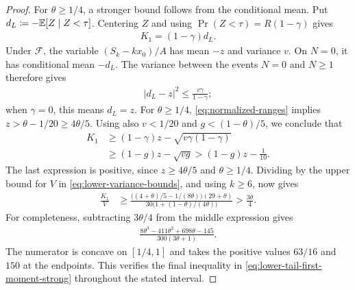 \begin{proof}
For $\theta\ge1/4$, a stronger bound follows from the conditional mean.
Put $d_L\coloneqq-\mathbb E[Z\mid Z<\tau]$.
Centering $Z$ and using $\Pr(Z<\tau)=R(1-\gamma)$ gives
\begin{align*}
 K_1=(1-\gamma)d_L.
\end{align*}
Under $\mathcal F$, the variable $(S_k-kx_0)/A$ has mean $-z$ and variance $v$.
On $N=0$, it has conditional mean $-d_L$.
The variance between the events $N=0$ and $N\ge1$ therefore gives
\begin{align*}
 |d_L-z|^2\le\frac{v\gamma}{1-\gamma};
\end{align*}
when $\gamma=0$, this means $d_L=z$.
For $\theta\ge1/4$, \cref{eq:normalized-ranges} implies
$z>\theta-1/20\ge4\theta/5$.
Using also $v<1/20$ and $g<(1-\theta)/5$, we conclude that
\begin{align*}
 K_1
 &\ge(1-\gamma)z-\sqrt{v\gamma(1-\gamma)}\\
 &\ge(1-g)z-\sqrt{vg}
 >(1-g)z-\frac1{10}.
\end{align*}
The last expression is positive, since $z\ge4\theta/5$ and $\theta\ge1/4$.
Dividing by the upper bound for $V$ in \cref{eq:lower-variance-bounds}, and using $k\ge6$, now gives
\begin{align}
 \frac{K_1}{V}
 &\ge
 \frac{\bigl((4+\theta)/5-1/(8\theta)\bigr)(29+\theta)}
 {30\bigl(1+(1-\theta)/(4\theta)\bigr)}
 >\frac{3\theta}{4}.
 \label{eq:lower-tail-first-moment-strong}
\end{align}
For completeness, subtracting $3\theta/4$ from the middle expression gives
\begin{align*}
 \frac{8\theta^3-411\theta^2+698\theta-145}{300(3\theta+1)}.
\end{align*}
The numerator is concave on $[1/4,1]$ and takes the positive values $63/16$ and $150$ at the endpoints.
This verifies the final inequality in \cref{eq:lower-tail-first-moment-strong} throughout the stated interval.


\end{proof}
